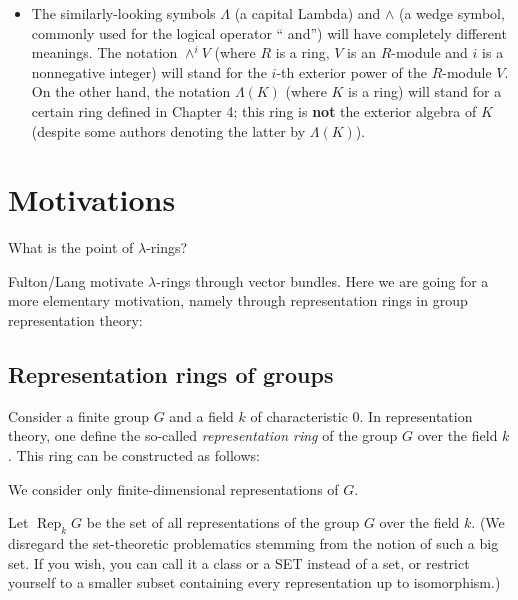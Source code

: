 \documentclass[numbers=enddot,12pt,final,onecolumn,notitlepage]{scrartcl}%
\begin{document}
\begin{itemize}
\item The similarly-looking symbols $\Lambda$ (a capital Lambda) and $\wedge$
(a wedge symbol, commonly used for the logical operator \textquotedblleft
and\textquotedblright) will have completely different meanings. The notation
$\wedge^{i}V$ (where $R$ is a ring, $V$ is an $R$-module and $i$ is a
nonnegative integer) will stand for the $i$-th exterior power of the
$R$-module $V$. On the other hand, the notation $\Lambda\left(  K\right)  $
(where $K$ is a ring) will stand for a certain ring defined in Chapter 4; this
ring is \textbf{not} the exterior algebra of $K$ (despite some authors
denoting the latter by $\Lambda\left(  K\right)  $).
\end{itemize}

\section{Motivations}

What is the point of $\lambda$-rings?

Fulton/Lang \cite{FulLan85} motivate $\lambda$-rings through vector bundles.
Here we are going for a more elementary motivation, namely through
representation rings in group representation theory:

\subsection{Representation rings of groups}

Consider a finite group $G$ and a field $k$ of characteristic $0$. In
representation theory, one define the so-called \textit{representation ring}
of the group $G$ over the field $k$. This ring can be constructed as follows:

We consider only finite-dimensional representations of $G$.

Let $\operatorname*{Rep}_{k}G$ be the set of all representations of the group
$G$ over the field $k$. (We disregard the set-theoretic problematics stemming
from the notion of such a big set. If you wish, you can call it a class or a
SET instead of a set, or restrict yourself to a smaller subset containing
every representation up to isomorphism.)
\end{document}
